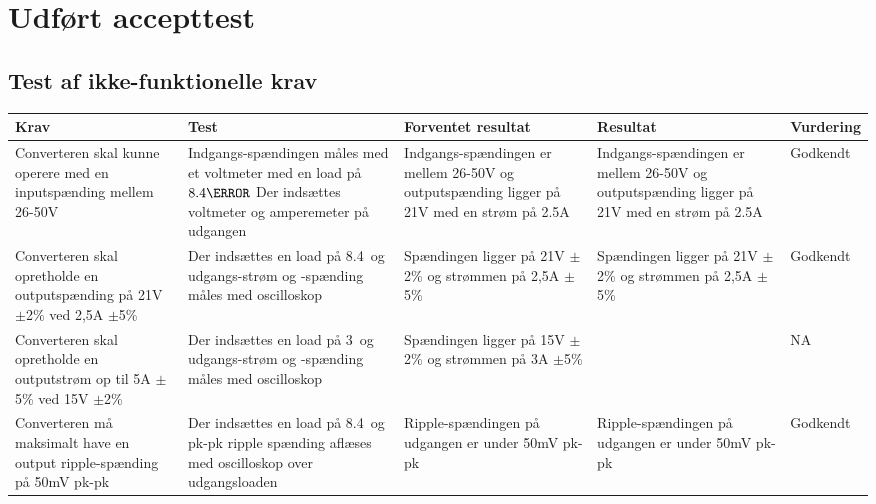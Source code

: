 \chapter{Udført accepttest}
\section{Test af ikke-funktionelle krav}

\begin{tabularx}{\textwidth}{|X|X|X|X|X|}
	\hline
	\textbf{Krav} & \textbf{Test} & \textbf{Forventet resultat} & \textbf{Resultat} & \textbf{Vurdering} \\ \hline
	Converteren skal kunne operere med en inputspænding mellem 26-50V & Indgangs-spændingen måles med et voltmeter med en load på $8.4\ohm$ Der indsættes voltmeter og amperemeter på udgangen & Indgangs-spændingen er mellem 26-50V og outputspænding ligger på 21V med en strøm på 2.5A & Indgangs-spændingen er mellem 26-50V og outputspænding ligger på 21V med en strøm på 2.5A & Godkendt\\ \hline
	Converteren skal opretholde en outputspænding på 21V $\pm$2\% ved 2,5A $\pm$5\% & Der indsættes en load på 8.4\ohm\ og udgangs-strøm og -spænding måles med oscilloskop & Spændingen ligger på 21V $\pm$2\% og strømmen på 2,5A $\pm$5\% & Spændingen ligger på 21V $\pm$2\% og strømmen på 2,5A $\pm$5\% & Godkendt \\ \hline
	Converteren skal opretholde en outputstrøm op til 5A $\pm$5\% ved 15V $\pm$2\% & Der indsættes en load på 3\ohm\ og udgangs-strøm og -spænding måles med oscilloskop & Spændingen ligger på 15V $\pm$2\% og strømmen på 3A $\pm$5\% && NA \\ \hline
	Converteren må maksimalt have en output ripple-spænding på 50mV pk-pk & Der indsættes en load på 8.4\ohm\ og pk-pk ripple spænding aflæses med oscilloskop over udgangsloaden & Ripple-spændingen på udgangen er under 50mV pk-pk & Ripple-spændingen på udgangen er under 50mV pk-pk & Godkendt \\ \hline
\end{tabularx}



